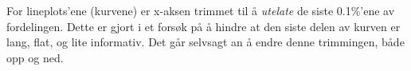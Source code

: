 For lineplots'ene (kurvene) er x-aksen trimmet til å \textit{utelate} de siste 0.1\%'ene av fordelingen.
Dette er gjort i et forsøk på å hindre at den siste delen av kurven er lang, flat, og lite informativ.
Det går selvsagt an å endre denne trimmingen, både opp og ned.